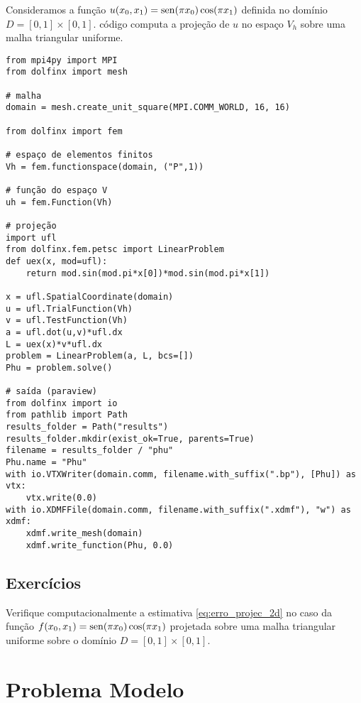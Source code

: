 \begin{ex}\label{cap_mef2d_sec_proj:ex:proj}
Consideramos a função $u(x_0,x_1) = \operatorname{sen}(\pi x_0)\cos(\pi x_1)$ definida no domínio $D = [0, 1]\times [0, 1]$. código computa a projeção de $u$ no espaço $V_h$ sobre uma malha triangular uniforme.
\begin{lstlisting}
from mpi4py import MPI
from dolfinx import mesh

# malha
domain = mesh.create_unit_square(MPI.COMM_WORLD, 16, 16)

from dolfinx import fem

# espaço de elementos finitos
Vh = fem.functionspace(domain, ("P",1))

# função do espaço V
uh = fem.Function(Vh)

# projeção
import ufl
from dolfinx.fem.petsc import LinearProblem
def uex(x, mod=ufl):
    return mod.sin(mod.pi*x[0])*mod.sin(mod.pi*x[1])

x = ufl.SpatialCoordinate(domain)
u = ufl.TrialFunction(Vh)
v = ufl.TestFunction(Vh)
a = ufl.dot(u,v)*ufl.dx
L = uex(x)*v*ufl.dx
problem = LinearProblem(a, L, bcs=[])
Phu = problem.solve()

# saída (paraview)
from dolfinx import io
from pathlib import Path
results_folder = Path("results")
results_folder.mkdir(exist_ok=True, parents=True)
filename = results_folder / "phu"
Phu.name = "Phu"
with io.VTXWriter(domain.comm, filename.with_suffix(".bp"), [Phu]) as vtx:
    vtx.write(0.0)
with io.XDMFFile(domain.comm, filename.with_suffix(".xdmf"), "w") as xdmf:
    xdmf.write_mesh(domain)
    xdmf.write_function(Phu, 0.0)
\end{lstlisting}
\end{ex}

\subsection{Exercícios}
\badgeRevisar

\begin{exer}
  Verifique computacionalmente a estimativa \eqref{eq:erro_projec_2d} no caso da função $f(x_0,x_1) = \operatorname{sen}(\pi x_0)\cos(\pi x_1)$ projetada sobre uma malha triangular uniforme sobre o domínio $D = [0, 1]\times [0, 1]$.
\end{exer}

\section{Problema Modelo}\label{cap_mef2d_sec_probmodelo}
\badgeRevisar

